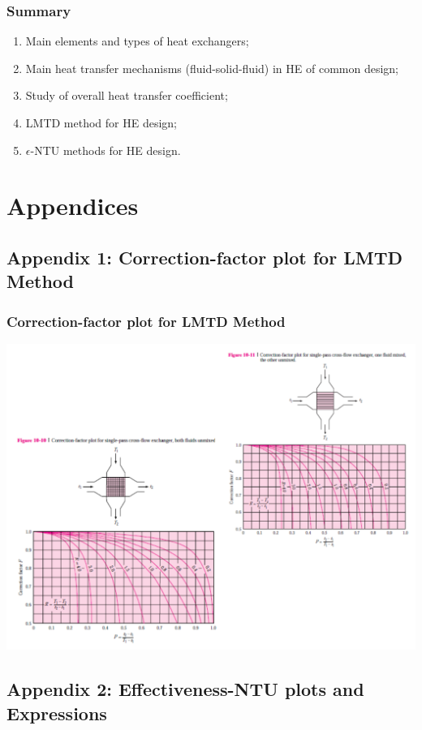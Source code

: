 \documentclass[10pt,compress,unknownkeysallowed]{beamer}
\begin{document}
\begin{frame}
  \frametitle{Summary}
    \begin{enumerate}
       \item Main elements and types of heat exchangers;
       \item Main heat transfer mechanisms (fluid-solid-fluid) in HE of common design;
       \item Study of overall heat transfer coefficient;
       \item LMTD method for HE design;
       \item $\epsilon$-NTU methods for HE design.
    \end{enumerate}
\end{frame}








\section{Appendices}

\subsection{Appendix 1: Correction-factor plot for LMTD Method}\label{appendix1}


{
  
}
\begin{frame}
 \frametitle{Correction-factor plot for LMTD Method}
        \begin{center}
          \includegraphics[width=.9\columnwidth,height=.65\columnwidth,clip]{./Pics/LMTD_Plot2}
        \end{center}
\end{frame}
 


\subsection{Appendix 2: Effectiveness-NTU plots and Expressions}\label{appendix2}


{
  
}
\end{document}
